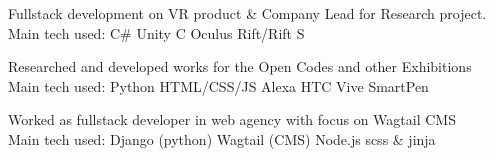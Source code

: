 \documentclass[a4paper]{deedy-resume_twopage} %
\begin{document}
\begin{minipage}[t]{0.66\textwidth}
  \sectionspace %


  \item Fullstack development on VR product \& Company Lead for Research project.
  \\ Main tech used: \textbullet{} C\# \textbullet{} Unity \textbullet{} C \textbullet{} Oculus Rift/Rift S

  \sectionspace %


  \item Researched and developed works for the Open Codes and other Exhibitions
  \\ Main tech used: \textbullet{} Python \textbullet{} HTML/CSS/JS \textbullet{} Alexa \textbullet{} HTC Vive \textbullet{} SmartPen \textbullet{}

  \sectionspace %


  \item Worked as fullstack developer in web agency with focus on Wagtail CMS
   \\ Main tech used: \textbullet{} Django (python) \textbullet{} Wagtail (CMS) \textbullet{} Node.js \textbullet{} scss \& jinja


\end{minipage}
\end{document}
